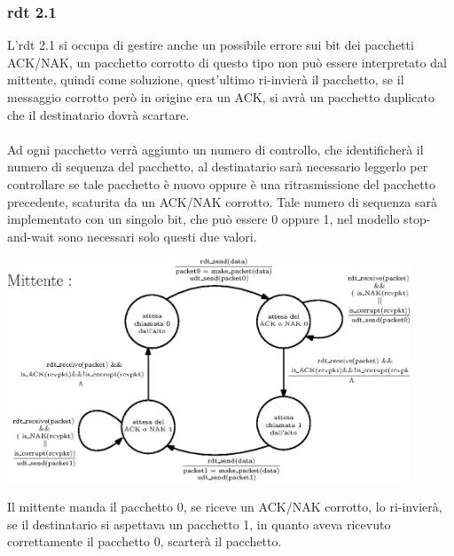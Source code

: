 \documentclass[12pt, letterpaper]{article}
\newcommand{\acc}{\\\hphantom{}\\}
\begin{document}
\subsubsection{rdt 2.1}
L'rdt 2.1 si occupa di gestire anche un possibile errore sui bit dei pacchetti ACK/NAK, un pacchetto corrotto di questo
tipo non può essere interpretato dal mittente, quindi come soluzione, quest'ultimo ri-invierà il pacchetto, se il messaggio
corrotto però in origine era un ACK, si avrà un pacchetto duplicato che il destinatario dovrà scartare.\acc
Ad ogni pacchetto verrà aggiunto un numero di controllo, che identificherà il numero di sequenza del pacchetto, al
destinatario sarà necessario leggerlo per controllare se tale pacchetto è nuovo oppure è una ritrasmissione
del pacchetto precedente, scaturita da un ACK/NAK corrotto. Tale numero di sequenza sarà implementato con un singolo
bit, che può essere 0 oppure 1, nel modello stop-and-wait sono necessari solo questi due valori.\begin{center}
    \includegraphics[width=0.9\textwidth ]{images/rdt2.1.eps}
\end{center}
Il mittente manda il pacchetto 0, se riceve un ACK/NAK corrotto, lo ri-invierà, se il destinatario si aspettava un pacchetto
1, in quanto aveva ricevuto correttamente il pacchetto 0, scarterà il pacchetto.
\end{document}
